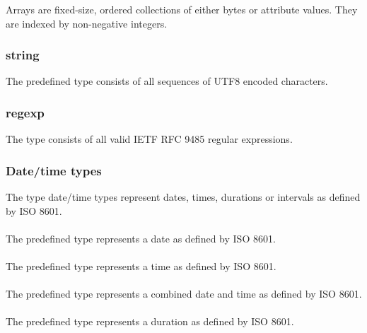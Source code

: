 \documentclass{article}
\begin{document}
{Arrays are fixed-size, ordered collections of either bytes or attribute values. They are indexed by non-negative integers.
 
 
\subsubsection{string}
\label{string}

The predefined type \STRING{} consists of all sequences of  UTF8 encoded characters.

\subsubsection{regexp}
\label{regexp}

The type \REGEX{} consists of all valid IETF RFC 9485 regular expressions.

\subsubsection{Date/time types}
\label{dateTime}

The type date/time types represent dates, times, durations or intervals as defined by ISO 8601. 

\paragraph{\DATE}
 \label{date}
The predefined type \DATE represents a date as defined by ISO 8601.

\paragraph{\TIME}
 \label{time}
 
The predefined type \TIME represents a time as defined by ISO 8601.

\paragraph{\TIMESTAMP}
 \label{timestamp}
 
 The predefined type \TIMESTAMP represents a combined date and time as defined by ISO 8601.
 
\paragraph{\DURATION}
 \label{duration}
 
  The predefined type \DURATION represents a duration as defined by ISO 8601.

}
\end{document}
